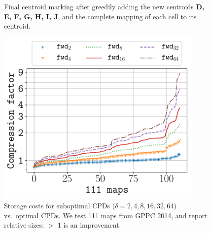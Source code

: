 \begin{figure}[t]
\begin{minipage}{0.48\textwidth}
    \centering
    \caption{\small Final centroid marking after greedily adding the new centroids 
    {\bf D, E, F, G, H, I, J}, and the complete mapping of each cell to its 
    centroid.}
    \label{fig:cf}
\end{minipage}
\hspace{1em}
\begin{minipage}{0.48\textwidth}
    \centering
    \includegraphics[width=0.9\textwidth]{pic/fwd0-fwd.pdf}
    \caption{
    \small
    Storage costs for
    suboptimal CPDs \mbox{($\delta = 2, 4, 8, 16, 32, 64$)} vs.\ optimal 
    CPDs. We test 111 maps from GPPC 2014, and report relative sizes;
    $>$ 1 is an improvement.}
    \label{fig:fwd0-fwdc}

\end{minipage}
\end{figure}

